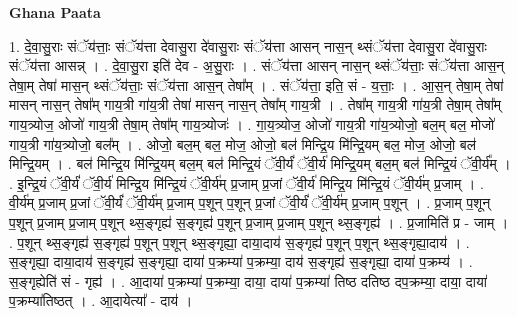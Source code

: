 \documentclass[17pt]{extarticle}
\begin{document}
\textbf{Ghana Paata } \newline

1. दे॒वा॒सु॒राः संॅय॑त्ताः॒ संॅय॑त्ता देवासु॒रा दे॑वासु॒राः संॅय॑त्ता आसन् नास॒न् थ्संॅय॑त्ता देवासु॒रा दे॑वासु॒राः संॅय॑त्ता आसन्न् । . दे॒वा॒सु॒रा इति॑ देव - अ॒सु॒राः । . संॅय॑त्ता आसन् नास॒न् थ्संॅय॑त्ताः॒ संॅय॑त्ता आस॒न् तेषा॒म् तेषा॑ मास॒न् थ्संॅय॑त्ताः॒ संॅय॑त्ता आस॒न् तेषा᳚म् । . संॅय॑त्ता॒ इति॒ सं - य॒त्ताः॒ । . आ॒स॒न् तेषा॒म् तेषा॑ मासन् नास॒न् तेषा᳚म् गाय॒त्री गा॑य॒त्री तेषा॑ मासन् नास॒न् तेषा᳚म् गाय॒त्री । . तेषा᳚म् गाय॒त्री गा॑य॒त्री तेषा॒म् तेषा᳚म् गाय॒त्र्योज॒ ओजो॑ गाय॒त्री तेषा॒म् तेषा᳚म् गाय॒त्र्योजः॑ । . गा॒य॒त्र्योज॒ ओजो॑ गाय॒त्री गा॑य॒त्र्योजो॒ बल॒म् बल॒ मोजो॑ गाय॒त्री गा॑य॒त्र्योजो॒ बल᳚म् । . ओजो॒ बल॒म् बल॒ मोज॒ ओजो॒ बल॑ मिन्द्रि॒य मि॑न्द्रि॒यम् बल॒ मोज॒ ओजो॒ बल॑ मिन्द्रि॒यम् । . बल॑ मिन्द्रि॒य मि॑न्द्रि॒यम् बल॒म् बल॑ मिन्द्रि॒यं ॅवी॒र्यं॑ ॅवी॒र्य॑ मिन्द्रि॒यम् बल॒म् बल॑ मिन्द्रि॒यं ॅवी॒र्य᳚म् । . इ॒न्द्रि॒यं ॅवी॒र्यं॑ ॅवी॒र्य॑ मिन्द्रि॒य मि॑न्द्रि॒यं ॅवी॒र्य॑म् प्र॒जाम् प्र॒जां ॅवी॒र्य॑ मिन्द्रि॒य मि॑न्द्रि॒यं ॅवी॒र्य॑म् प्र॒जाम् । . वी॒र्य॑म् प्र॒जाम् प्र॒जां ॅवी॒र्यं॑ ॅवी॒र्य॑म् प्र॒जाम् प॒शून् प॒शून् प्र॒जां ॅवी॒र्यं॑ ॅवी॒र्य॑म् प्र॒जाम् प॒शून् । . प्र॒जाम् प॒शून् प॒शून् प्र॒जाम् प्र॒जाम् प॒शून् थ्स॒ङ्गृह्य॑ स॒ङ्गृह्य॑ प॒शून् प्र॒जाम् प्र॒जाम् प॒शून् थ्स॒ङ्गृह्य॑ । . प्र॒जामिति॑ प्र - जाम् । . प॒शून् थ्स॒ङ्गृह्य॑ स॒ङ्गृह्य॑ प॒शून् प॒शून् थ्स॒ङ्गृह्या॒ दाया॒दाय॑ स॒ङ्गृह्य॑ प॒शून् प॒शून् थ्स॒ङ्गृह्या॒दाय॑ । . स॒ङ्गृह्या॒ दाया॒दाय॑ स॒ङ्गृह्य॑ स॒ङ्गृह्या॒ दाया॑ प॒क्रम्या॑ प॒क्रम्या॒ दाय॑ स॒ङ्गृह्य॑ स॒ङ्गृह्या॒ दाया॑ प॒क्रम्य॑ । . स॒ङ्गृह्येति॑ सं - गृह्य॑ । . आ॒दाया॑ प॒क्रम्या॑ प॒क्रम्या॒ दाया॒ दाया॑ प॒क्रम्या॑ तिष्ठ दतिष्ठ दप॒क्रम्या॒ दाया॒ दाया॑ प॒क्रम्या॑तिष्ठत् । . आ॒दायेत्या᳚ - दाय॑ । \newline
\end{document}
